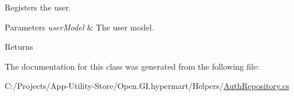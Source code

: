 Registers the user. 


\begin{DoxyParams}{Parameters}
{\em user\+Model} & The user model.\\
\hline
\end{DoxyParams}
\begin{DoxyReturn}{Returns}

\end{DoxyReturn}


The documentation for this class was generated from the following file\+:\begin{DoxyCompactItemize}
\item 
C\+:/\+Projects/\+App-\/\+Utility-\/\+Store/\+Open.\+G\+I.\+hypermart/\+Helpers/\hyperlink{_auth_repository_8cs}{Auth\+Repository.\+cs}\end{DoxyCompactItemize}
